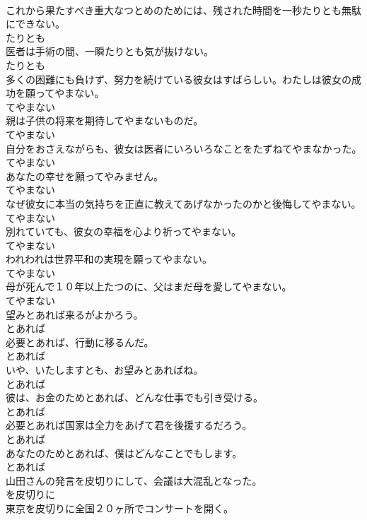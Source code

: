 \documentclass[8pt]{extreport}
\begin{document}
\begin{CJK}{UTF8}{min}
\\	これから果たすべき重大なつとめのためには、残された時間を一秒たりとも無駄にできない。	
\\	たりとも
\\	医者は手術の間、一瞬たりとも気が抜けない。	
\\	たりとも
\\	多くの困難にも負けず、努力を続けている彼女はすばらしい。わたしは彼女の成功を願ってやまない。	
\\	てやまない
\\	親は子供の将来を期待してやまないものだ。	
\\	てやまない
\\	自分をおさえながらも、彼女は医者にいろいろなことをたずねてやまなかった。	
\\	てやまない
\\	あなたの幸せを願ってやみません。	
\\	てやまない
\\	なぜ彼女に本当の気持ちを正直に教えてあげなかったのかと後悔してやまない。	
\\	てやまない
\\	別れていても、彼女の幸福を心より祈ってやまない。	
\\	てやまない
\\	われわれは世界平和の実現を願ってやまない。	
\\	てやまない
\\	母が死んで１０年以上たつのに、父はまだ母を愛してやまない。	
\\	てやまない
\\	望みとあれば来るがよかろう。	
\\	とあれば
\\	必要とあれば、行動に移るんだ。	
\\	とあれば
\\	いや、いたしますとも、お望みとあればね。	
\\	とあれば
\\	彼は、お金のためとあれば、どんな仕事でも引き受ける。	
\\	とあれば
\\	必要とあれば国家は全力をあげて君を後援するだろう。	
\\	とあれば
\\	あなたのためとあれば、僕はどんなことでもします。	
\\	とあれば
\\	山田さんの発言を皮切りにして、会議は大混乱となった。	
\\	を皮切りに
\\	東京を皮切りに全国２０ヶ所でコンサートを開く。	

\end{CJK}
\end{document}
